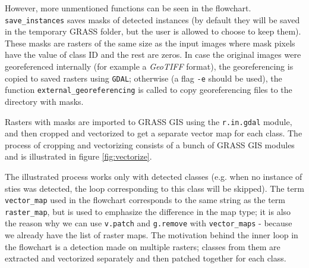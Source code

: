 However, more unmentioned functions can be seen in the flowchart. \verb|save_instances| saves masks of detected instances (by default they will be saved in the temporary GRASS folder, but the user is allowed to choose to keep them). These masks are rasters of the same size as the input images where mask pixels have the value of class ID and the rest are zeros. In case the original images were georeferenced internally (for example a \textit{GeoTIFF} format), the georeferencing is copied to saved rasters using \verb|GDAL|; otherwise (a flag \verb|-e| should be used), the function \verb|external_georeferencing| is called to copy georeferencing files to the directory with masks.

Rasters with masks are imported to GRASS GIS using the \verb|r.in.gdal| module, and then cropped and vectorized to get a separate vector map for each class. The process of cropping and vectorizing consists of a bunch of GRASS GIS modules and is illustrated in figure \ref{fig:vectorize}.

The illustrated process works only with detected classes (e.g. when no instance of sties was detected, the loop corresponding to this class will be skipped). The term \verb|vector_map| used in the flowchart corresponds to the same string as the term \verb|raster_map|, but is used to emphasize the difference in the map type; it is also the reason why we can use \verb|v.patch| and \verb|g.remove| with \verb|vector_maps| - because we already have the list of raster maps. The motivation behind the inner loop in the flowchart is a detection made on multiple rasters; classes from them are extracted and vectorized separately and then patched together for each class.

